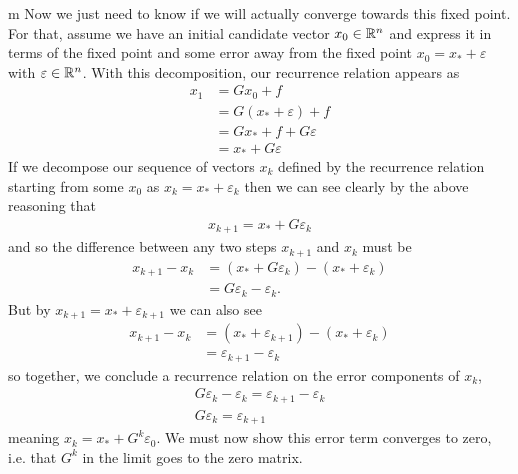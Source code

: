\documentclass[11pt]{article}
\begin{document}
\begin{my proof}{m}
Now we just need to know if we will actually converge towards this fixed point. For that, assume we have an initial candidate vector $x_0 \in \mathbb{R}^n$ and express it in terms of the fixed point and some error away from the fixed point $x_0 = x_* + \varepsilon$ with $\varepsilon \in \mathbb{R}^n$. With this decomposition, our recurrence relation appears as \begin{align*}
x_{1} &= Gx_0 + f \\
&= G(x_* + \varepsilon) + f\\
&= Gx_* + f + G \varepsilon \\
&= x_* + G \varepsilon
\end{align*}
If we decompose our sequence of vectors $x_{k}$ defined by the recurrence relation starting from some $x_0$ as $x_k = x_* + \varepsilon_k$ then we can see clearly by the above reasoning that \begin{gather*}
x_{k+1} = x_* + G \varepsilon_k
\end{gather*}
and so the difference between any two steps $x_{k+1}$ and $x_k$ must be \begin{align*}
x_{k+1} - x_k &= (x_* + G \varepsilon_k) - (x_* + \varepsilon_k) \\
&= G \varepsilon_k - \varepsilon_k.
\end{align*}
But by $x_{k+1} = x_* + \varepsilon_{k+1}$ we can also see \begin{align*}
x_{k+1} - x_k &= (x_* + \varepsilon_{k+1}) - (x_* + \varepsilon_k) \\
&= \varepsilon_{k+1} - \varepsilon_k
\end{align*}
so together, we conclude a recurrence relation on the error components of $x_k$, \begin{gather*}
G \varepsilon_k - \varepsilon_k = \varepsilon_{k+1} - \varepsilon_k \\
G \varepsilon_k = \varepsilon_{k+1}
\end{gather*}
meaning $x_k = x_* + G^k \varepsilon_0$. We must now show this error term converges to zero, i.e. that $G^k$ in the limit goes to the zero matrix.


\end{my proof}
\end{document}
